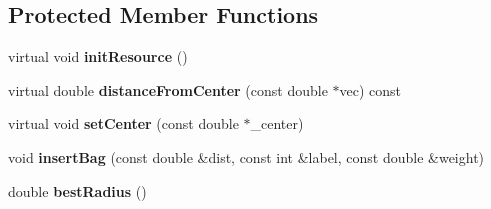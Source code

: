 \subsection*{Protected Member Functions}
\begin{DoxyCompactItemize}
\item 
virtual void {\bfseries init\+Resource} ()\label{classiCub_1_1boostMIL_1_1MILClassifier_a8c33dcb392bdb02bd93382081107b031}

\item 
virtual double {\bfseries distance\+From\+Center} (const double $\ast$vec) const \label{classiCub_1_1boostMIL_1_1MILClassifier_ab426f2d2b96e1134b9cd98757eefac83}

\item 
virtual void {\bfseries set\+Center} (const double $\ast$\+\_\+center)\label{classiCub_1_1boostMIL_1_1MILClassifier_a2a9a78d644ff9ae304cf1161bea1e2f8}

\item 
void {\bfseries insert\+Bag} (const double \&dist, const int \&label, const double \&weight)\label{classiCub_1_1boostMIL_1_1MILClassifier_ad88530d855c7c4c926e98f29d460d86f}

\item 
double {\bfseries best\+Radius} ()\label{classiCub_1_1boostMIL_1_1MILClassifier_a338d10ac366ebe4a5992065a9ebf0725}

\end{DoxyCompactItemize}
